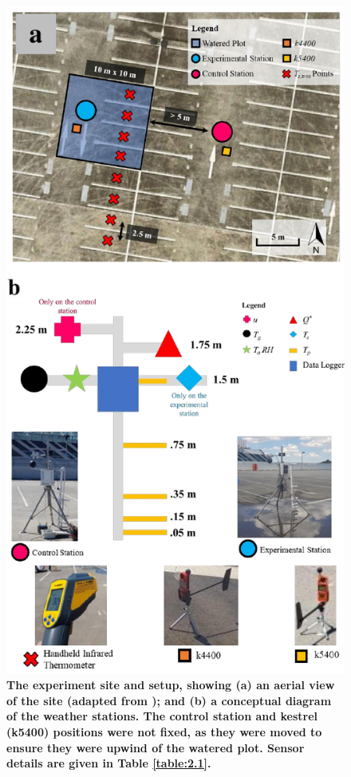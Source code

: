 \documentclass[final,3p,times,authoryear]{elsarticle}
\begin{document}
\begin{figure}
\centering
\includegraphics[trim={0 0 0 0},clip,scale=1.0]{pict001b.png}
\caption{\bf The experiment site and setup, showing (a) an aerial view of the site (adapted from \cite{Nearmap2022}); and (b) a conceptual diagram of the weather stations. The control station and kestrel (k5400) positions were not fixed, as they were moved to ensure they were upwind of the watered plot. Sensor details are given in Table \ref{table:2.1}.}
 \label{fig:2.1}
\end{figure}
\end{document}

